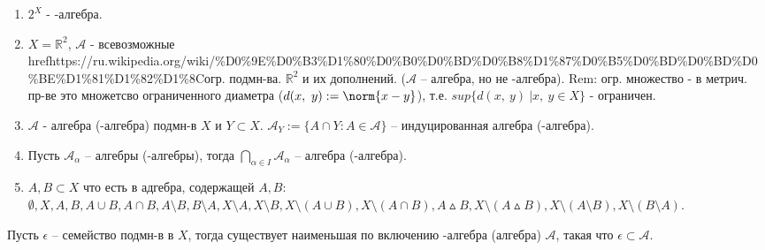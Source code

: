 \begin{example}
    \begin{enumerate}
        \item $2^X$ - \sigma-алгебра.
        
        \item $X = \mathbb{R}^2$, $\mathcal{A}$ - всевозможные href{https://ru.wikipedia.org/wiki/\%D0\%9E\%D0\%B3\%D1\%80\%D0\%B0\%D0\%BD\%D0\%B8\%D1\%87\%D0\%B5\%D0\%BD\%D0\%BD\%D0\%BE\%D1\%81\%D1\%82\%D1\%8C}{огр. подмн-ва.} $\mathbb{R}^2$ и их дополнений. ($\mathcal{A}$ -- алгебра, но не \sigma-алгебра). Rem: огр. множество - в метрич. пр-ве это множетсво ограниченного диаметра ($d(x, \ y) := \norm{x - y}$), т.е. $sup\{ d(x, \ y) \ | x, \ y \in X \}$ - ограничен.

        \item $\mathcal{A}$ - алгебра (\sigma-алгебра) подмн-в $X$ и $Y \subset X$. $\mathcal{A}_{Y} := \{A \cap Y : A \in \mathcal{A}\}$ -- индуцированная алгебра (\sigma-алгебра).
        
        \item Пусть $\mathcal{A}_{\alpha}$ -- алгебры (\sigma-алгебры), тогда $\bigcap_{\alpha \in I}\mathcal{A}_{\alpha}$ -- алгебра (\sigma-алгебра).
        
        \item $A, B \subset X$ что есть в адгебра, содержащей $A, B$: \\ $\emptyset, X, A, B, A \cup B, A \cap B, A \setminus B, B \setminus A, X \setminus A, X \setminus B, X \setminus (A \cup B), X \setminus (A \cap B), A \vartriangle B, X \setminus (A \vartriangle B), X \setminus (A \setminus B), X \setminus (B \setminus A)$.
    \end{enumerate}
\end{example}

\begin{theorem}
    Пусть $\epsilon$ -- семейство подмн-в в $X$, тогда существует наименьшая по включению \sigma-алгебра (алгебра) $\mathcal{A}$, такая что $\epsilon \subset \mathcal{A}$.
\end{theorem}

